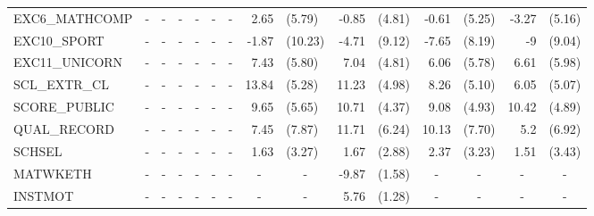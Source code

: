 \documentclass[12pt]{article}%
\begin{document}
\begin{table}[H]
\begin{tabular}{lrlrlrlrlrlrlrl}
			EXC6\_MATHCOMP & \multicolumn{1}{c}{-} & \multicolumn{1}{c}{-} & \multicolumn{1}{c}{-} & \multicolumn{1}{c}{-} & \multicolumn{1}{c}{-} & \multicolumn{1}{c}{-} & 2.65  & (5.79) & -0.85 & (4.81) & -0.61 & (5.25) & -3.27 & (5.16) \\[0.2em]
			EXC10\_SPORT & \multicolumn{1}{c}{-} & \multicolumn{1}{c}{-} & \multicolumn{1}{c}{-} & \multicolumn{1}{c}{-} & \multicolumn{1}{c}{-} & \multicolumn{1}{c}{-} & -1.87 & (10.23) & -4.71 & (9.12) & -7.65 & (8.19) & -9    & (9.04) \\[0.2em]
			EXC11\_UNICORN & \multicolumn{1}{c}{-} & \multicolumn{1}{c}{-} & \multicolumn{1}{c}{-} & \multicolumn{1}{c}{-} & \multicolumn{1}{c}{-} & \multicolumn{1}{c}{-} & 7.43  & (5.80) & 7.04  & (4.81) & 6.06  & (5.78) & 6.61  & (5.98) \\[0.2em]
			SCL\_EXTR\_CL & \multicolumn{1}{c}{-} & \multicolumn{1}{c}{-} & \multicolumn{1}{c}{-} & \multicolumn{1}{c}{-} & \multicolumn{1}{c}{-} & \multicolumn{1}{c}{-} & 13.84 & (5.28) & 11.23 & (4.98) & 8.26  & (5.10) & 6.05  & (5.07) \\[0.2em]
			SCORE\_PUBLIC & \multicolumn{1}{c}{-} & \multicolumn{1}{c}{-} & \multicolumn{1}{c}{-} & \multicolumn{1}{c}{-} & \multicolumn{1}{c}{-} & \multicolumn{1}{c}{-} & 9.65  & (5.65) & 10.71 & (4.37) & 9.08  & (4.93) & 10.42 & (4.89) \\[0.2em]
			QUAL\_RECORD & \multicolumn{1}{c}{-} & \multicolumn{1}{c}{-} & \multicolumn{1}{c}{-} & \multicolumn{1}{c}{-} & \multicolumn{1}{c}{-} & \multicolumn{1}{c}{-} & 7.45  & (7.87) & 11.71 & (6.24) & 10.13 & (7.70) & 5.2   & (6.92) \\[0.2em]
			SCHSEL & \multicolumn{1}{c}{-} & \multicolumn{1}{c}{-} & \multicolumn{1}{c}{-} & \multicolumn{1}{c}{-} & \multicolumn{1}{c}{-} & \multicolumn{1}{c}{-} & 1.63  & (3.27) & 1.67  & (2.88) & 2.37  & (3.23) & 1.51  & (3.43) \\[0.2em]
			MATWKETH & \multicolumn{1}{c}{-} & \multicolumn{1}{c}{-} & \multicolumn{1}{c}{-} & \multicolumn{1}{c}{-} & \multicolumn{1}{c}{-} & \multicolumn{1}{c}{-} & \multicolumn{1}{c}{-} & \multicolumn{1}{c}{-} & -9.87 & (1.58) & \multicolumn{1}{c}{-} & \multicolumn{1}{c}{-} & \multicolumn{1}{c}{-} & \multicolumn{1}{c}{-} \\[0.2em]
			INSTMOT & \multicolumn{1}{c}{-} & \multicolumn{1}{c}{-} & \multicolumn{1}{c}{-} & \multicolumn{1}{c}{-} & \multicolumn{1}{c}{-} & \multicolumn{1}{c}{-} & \multicolumn{1}{c}{-} & \multicolumn{1}{c}{-} & 5.76  & (1.28) & \multicolumn{1}{c}{-} & \multicolumn{1}{c}{-} & \multicolumn{1}{c}{-} & \multicolumn{1}{c}{-} \\[0.2em]

\end{tabular}
\end{table}
\end{document}
